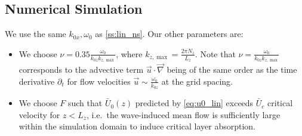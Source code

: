 \documentclass[twocolumn,
        usenames, %
        dvipsnames %
    ]{revtex4-1}%
\begin{document}
\subsection{Numerical Simulation}

We use the same $k_{0x}, \omega_0$ as \autoref{ss:lin_ns}. Our other parameters
are:
\begin{itemize}
    \item We choose $\nu = 0.35 \frac{\omega_0}{k_{0z}k_{z, \max}}$, where
        $k_{z, \max} = \frac{2\pi N_z}{L_z}$. Note that $\nu =
        \frac{\omega_0}{k_{0z} k_{z, \max}}$ corresponds to the advective term
        $\vec{u} \cdot \vec{\nabla}$ being of the same order as the time
        derivative $\partial_t$ for flow velocities $\vec{u} \sim
        \frac{\omega_0}{k_{0z}}$ at the grid spacing.

    \item We choose $F$ such that $\bar{U}_0(z)$ predicted by
        \autoref{eq:u0_lin} exceeds $\bar{U}_c$ critical velocity for $z <
        L_z$, i.e.\ the wave-induced mean flow is sufficiently large within the
        simulation domain to induce critical layer absorption.
\end{itemize}
\end{document}
